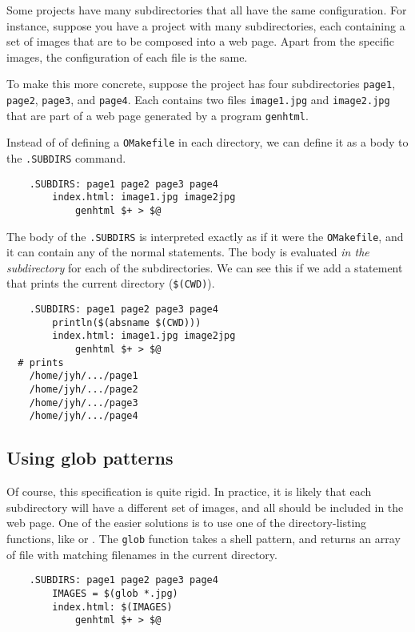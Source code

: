 Some projects have many subdirectories that all have the same configuration.  For instance, suppose
you have a project with many subdirectories, each containing a set of images that are to be composed
into a web page.  Apart from the specific images, the configuration of each file is the same.

To make this more concrete, suppose the project has four subdirectories \verb+page1+, \verb+page2+,
\verb+page3+, and \verb+page4+.  Each contains two files \verb+image1.jpg+ and \verb+image2.jpg+
that are part of a web page generated by a program \verb+genhtml+.

Instead of of defining a \verb+OMakefile+ in each directory, we can define it as a body to the
\verb+.SUBDIRS+ command.

\begin{verbatim}
    .SUBDIRS: page1 page2 page3 page4
        index.html: image1.jpg image2jpg
            genhtml $+ > $@
\end{verbatim}

The body of the \verb+.SUBDIRS+ is interpreted exactly as if it were the \verb+OMakefile+, and it
can contain any of the normal statements.  The body is evaluated \emph{in the subdirectory} for each
of the subdirectories.  We can see this if we add a statement that prints the current directory
(\verb+$(CWD)+).

\begin{verbatim}
    .SUBDIRS: page1 page2 page3 page4
        println($(absname $(CWD)))
        index.html: image1.jpg image2jpg
            genhtml $+ > $@
  # prints
    /home/jyh/.../page1
    /home/jyh/.../page2
    /home/jyh/.../page3
    /home/jyh/.../page4
\end{verbatim}

\subsection{Using glob patterns}

Of course, this specification is quite rigid.  In practice, it is likely that each subdirectory will
have a different set of images, and all should be included in the web page.  One of the easier
solutions is to use one of the directory-listing functions, like
 or .
The \verb+glob+ function takes a shell pattern, and returns an array of
file with matching filenames in the current directory.

\begin{verbatim}
    .SUBDIRS: page1 page2 page3 page4
        IMAGES = $(glob *.jpg)
        index.html: $(IMAGES)
            genhtml $+ > $@
\end{verbatim}

